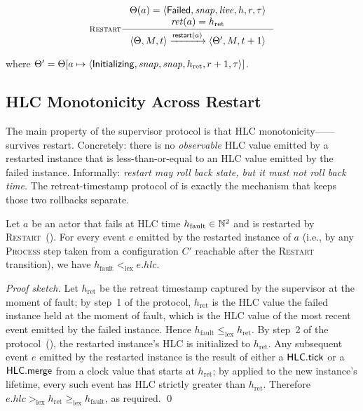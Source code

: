 \begin{equation}
\inference[\textsc{Restart}]
{
  \Theta(a) = \langle \Failed{}, \mathit{snap}, \mathit{live}, h, r, \tau\rangle \\
  \mathit{ret}(a) = h_{\mathrm{ret}}
}
{
  \langle \Theta, M, t\rangle
  \trans{\mathsf{restart}(a)}
  \langle \Theta', M, t+1\rangle
}
\label{rule:restart}
\end{equation}

\noindent where
\(\Theta' = \Theta[a \mapsto
  \langle \mathsf{Initializing}{}, \mathit{snap}, \mathit{snap},
          h_{\mathrm{ret}}, r+1, \tau\rangle]\).

\subsection{HLC Monotonicity Across Restart}
\label{sec:supervision:monotonicity}

The main property of the supervisor protocol is that HLC
monotonicity——survives restart.
Concretely: there is no \emph{observable} HLC value emitted by a
restarted instance that is less-than-or-equal to an HLC value emitted
by the failed instance.  Informally: \emph{restart may roll back
state, but it must not roll back time.}  The retreat-timestamp
protocol of  is exactly the mechanism
that keeps those two rollbacks separate.

\begin{theorem}
\label{thm:hlc-restart-monotone}
Let \(a\) be an actor that fails at HLC time
\(h_{\mathrm{fault}} \in \mathbb{N}^2\) and is restarted by
\textsc{Restart}~().  For every event \(e\)
emitted by the restarted instance of \(a\) (i.e., by any
\textsc{Process} step taken from a configuration \(C'\) reachable
after the \textsc{Restart} transition), we have
\(h_{\mathrm{fault}} <_{\mathrm{lex}} e.\mathit{hlc}\).
\end{theorem}

\begin{proof}[Proof sketch]
Let \(h_{\mathrm{ret}}\) be the retreat timestamp captured by the
supervisor at the moment of fault; by step~1 of the protocol,
\(h_{\mathrm{ret}}\) is the HLC value the failed instance held at
the moment of fault, which is the HLC value of the most recent
event emitted by the failed instance.  Hence \(h_{\mathrm{fault}}
\le_{\mathrm{lex}} h_{\mathrm{ret}}\).  By step~2 of the
protocol~(), the restarted instance's HLC is
initialized to \(h_{\mathrm{ret}}\).  Any subsequent event \(e\)
emitted by the restarted instance is the result of either a
\(\mathsf{HLC}.\mathsf{tick}\) or a \(\mathsf{HLC}.\mathsf{merge}\) from a clock
value that starts at \(h_{\mathrm{ret}}\); by
 applied to the new instance's
lifetime, every such event has HLC strictly greater than
\(h_{\mathrm{ret}}\).  Therefore \(e.\mathit{hlc}
>_{\mathrm{lex}} h_{\mathrm{ret}} \ge_{\mathrm{lex}}
h_{\mathrm{fault}}\), as required.
\qed
\end{proof}

